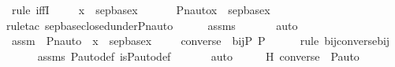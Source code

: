 \begin{isabellebody}
%
\isadelimproof
%
\endisadelimproof
%
\isatagproof
{}\isamarkupfalse%
\ {\isacharparenleft}{\kern0pt}rule\ iffI{\isacharparenright}{\kern0pt}\ \isanewline
\ \ \isamarkupfalse%
\ {\isachardoublequoteopen}x\ {\isasymin}\ sep{\isacharunderscore}{\kern0pt}base{\isacharparenleft}{\kern0pt}x{}{\isacharparenright}{\kern0pt}{\isachardoublequoteclose}\ \isanewline
\ \ \isamarkupfalse%
\ \isamarkupfalse%
\ {\isachardoublequoteopen}Pn{\isacharunderscore}{\kern0pt}auto{\isacharparenleft}{\kern0pt}{\isasympi}{\isacharparenright}{\kern0pt}{\isacharbackquote}{\kern0pt}x\ {\isasymin}\ sep{\isacharunderscore}{\kern0pt}base{\isacharparenleft}{\kern0pt}x{}{\isacharparenright}{\kern0pt}{\isachardoublequoteclose}\ \isanewline
\ \ \ \ \isamarkupfalse%
{\isacharparenleft}{\kern0pt}rule{\isacharunderscore}{\kern0pt}tac\ sep{\isacharunderscore}{\kern0pt}base{\isacharunderscore}{\kern0pt}closed{\isacharunderscore}{\kern0pt}under{\isacharunderscore}{\kern0pt}Pn{\isacharunderscore}{\kern0pt}auto{\isacharparenright}{\kern0pt}\isanewline
\ \ \ \ \isamarkupfalse%
\ assms\ \isanewline
\ \ \ \ \isamarkupfalse%
\ auto\ \isanewline
{}\isamarkupfalse%
\ \isanewline
\ \ \isamarkupfalse%
\ assm{}\ {\isacharcolon}{\kern0pt}\ {\isachardoublequoteopen}Pn{\isacharunderscore}{\kern0pt}auto{\isacharparenleft}{\kern0pt}{\isasympi}{\isacharparenright}{\kern0pt}\ {\isacharbackquote}{\kern0pt}\ x\ {\isasymin}\ sep{\isacharunderscore}{\kern0pt}base{\isacharparenleft}{\kern0pt}x{}{\isacharparenright}{\kern0pt}{\isachardoublequoteclose}\ \isanewline
\ \ \isamarkupfalse%
\ {\isachardoublequoteopen}converse{\isacharparenleft}{\kern0pt}{\isasympi}{\isacharparenright}{\kern0pt}\ {\isasymin}\ bij{\isacharparenleft}{\kern0pt}P{\isacharcomma}{\kern0pt}\ P{\isacharparenright}{\kern0pt}{\isachardoublequoteclose}\ \isanewline
\ \ \ \ \isamarkupfalse%
{\isacharparenleft}{\kern0pt}rule\ bij{\isacharunderscore}{\kern0pt}converse{\isacharunderscore}{\kern0pt}bij{\isacharparenright}{\kern0pt}\ \isanewline
\ \ \ \ \isamarkupfalse%
\ assms\ P{\isacharunderscore}{\kern0pt}auto{\isacharunderscore}{\kern0pt}def\ is{\isacharunderscore}{\kern0pt}P{\isacharunderscore}{\kern0pt}auto{\isacharunderscore}{\kern0pt}def\ \isanewline
\ \ \ \ \isamarkupfalse%
\ auto\isanewline
\ \ \isamarkupfalse%
\ \isamarkupfalse%
\ H{\isacharcolon}{\kern0pt}\ {\isachardoublequoteopen}converse{\isacharparenleft}{\kern0pt}{\isasympi}{\isacharparenright}{\kern0pt}\ {\isasymin}\ P{\isacharunderscore}{\kern0pt}auto{\isachardoublequoteclose}\ \isanewline

\end{isabellebody}
